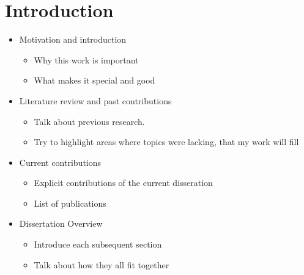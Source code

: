 
\chapter{Introduction}

\begin{itemize}
    \item Motivation and introduction
        \begin{itemize}
            \item Why this work is important
            \item What makes it special and good
        \end{itemize}
    \item Literature review and past contributions
        \begin{itemize}
            \item Talk about previous research.
            \item Try to highlight areas where topics were lacking, that my work will fill
        \end{itemize}
    \item Current contributions
        \begin{itemize}
            \item Explicit contributions of the current disseration
            \item List of publications
        \end{itemize}
    \item Dissertation Overview
        \begin{itemize}
            \item Introduce each subsequent section
            \item Talk about how they all fit together
        \end{itemize}

        
\end{itemize}

